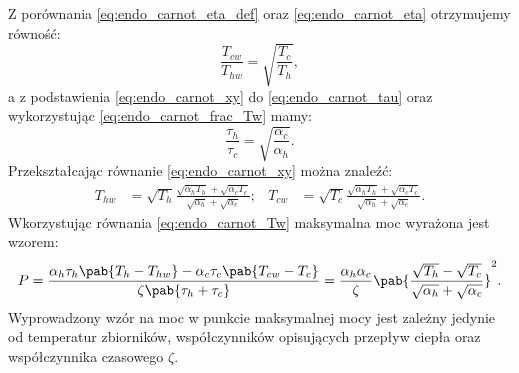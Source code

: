 Z porównania \eqref{eq:endo_carnot_eta_def} oraz \eqref{eq:endo_carnot_eta} otrzymujemy równość:
\begin{equation}\label{eq:endo_carnot_frac_Tw}
	\frac{T_{cw}}{T_{hw}} = \sqrt{\frac{T_{c}}{T_{h}}},
\end{equation}
a z podstawienia \eqref{eq:endo_carnot_xy} do \eqref{eq:endo_carnot_tau} oraz wykorzystując \eqref{eq:endo_carnot_frac_Tw} mamy:
\begin{equation}
	\frac{\tau_{h}}{\tau_{c}} = \sqrt{\frac{\alpha_{c}}{\alpha_{h}}}.
\end{equation}
Przekształcając równanie \eqref{eq:endo_carnot_xy} można znaleźć:
\begin{align}\label{eq:endo_carnot_Tw}
	T_{hw} &= \sqrt{T_{h}} \frac{\sqrt{\alpha_{h}T_{h}} + \sqrt{\alpha_{c}T_{c}}}{\sqrt{\alpha_{h}} + \sqrt{\alpha_{c}}}; & 
	T_{cw} &= \sqrt{T_{c}} \frac{\sqrt{\alpha_{h}T_{h}} + \sqrt{\alpha_{c}T_{c}}}{\sqrt{\alpha_{h}} + \sqrt{\alpha_{c}}}.
\end{align}
Wkorzystując równania \eqref{eq:endo_carnot_Tw} maksymalna moc wyrażona jest wzorem:
\begin{equation}\label{eq:endo_carnot_Pmax}
	P = \frac{\alpha_{h}\tau_{h}\pab{T_{h} - T_{hw}} - \alpha_{c}\tau_{c}\pab{T_{cw} - T_{c}}}{\zeta\pab{\tau_{h} + \tau_{c}}} = \frac{\alpha_{h}\alpha_{c}}{\zeta}\pab{\frac{\sqrt{T_{h}} - \sqrt{T_{c}}}{\sqrt{\alpha_{h}} + \sqrt{\alpha_{c}}}}^2.
\end{equation}
Wyprowadzony wzór na moc w punkcie maksymalnej mocy jest zależny jedynie od temperatur zbiorników, współczynników opisujących przepływ ciepła oraz współczynnika czasowego \(\zeta\).
